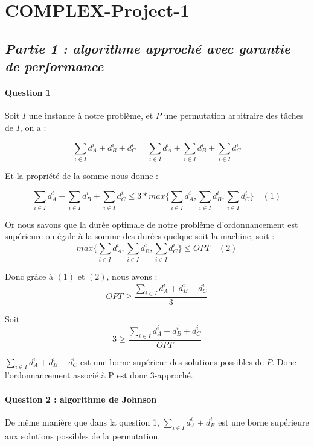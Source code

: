 \section{COMPLEX-Project-1}\label{complex-project-1}

\subsection{\texorpdfstring{\emph{Partie 1 : algorithme approché avec
garantie de
performance}}{Partie 1 : algorithme approché avec garantie de performance}}\label{partie-1-algorithme-approchuxe9-avec-garantie-de-performance}

\paragraph{Question 1}\label{question-1}

Soit \(I\) une instance à notre problème, et \(P\) une permutation
arbitraire des tâches de \(I\), on a :

\[\sum_{i \in I}d_A^i + d_B^i + d_C^i = \sum_{i \in I}d_A^i + \sum_{i \in I}d_B^i + \sum_{i \in I}d_C^i\]

Et la propriété de la somme nous donne :

\[\sum_{i \in I}d_A^i + \sum_{i \in I}d_B^i + \sum_{i \in I}d_C^i \leq 3*max\{\sum_{i \in I}d_A^i, \sum_{i \in I}d_B^i, \sum_{i \in I}d_C^i\} \quad (1)\]

Or nous savons que la durée optimale de notre problème d'ordonnancement
est supérieure ou égale à la somme des durées quelque soit la machine,
soit :
\[max\{\sum_{i \in I}d_A^i, \sum_{i \in I}d_B^i, \sum_{i \in I}d_C^i\} \leq OPT \quad (2)\]

Donc grâce à \((1)\) et \((2)\), nous avons :
\[OPT \geq \frac{\sum_{i \in I}d_A^i + d_B^i + d_C^i}{3}\]

Soit\\\[3 \geq \frac{\sum_{i \in I}d_A^i + d_B^i + d_C^i}{OPT}\]

\(\sum_{i \in I}d_A^i + d_B^i + d_C^i\) est une borne supérieur des
solutions possibles de \(P\). Donc l'ordonnancement associé à P est donc
3-approché.

\paragraph{Question 2 : algorithme de
Johnson}\label{question-2-algorithme-de-johnson}

De même manière que dans la question 1, \(\sum_{i \in I}d_A^i + d_B^i\)
est une borne supérieure aux solutions possibles de la permutation.

